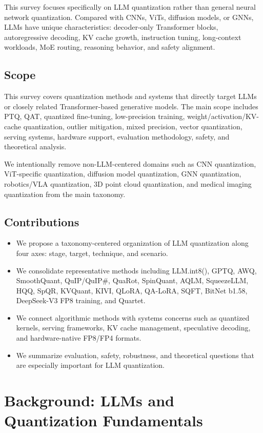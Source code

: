 \documentclass[journal,10pt]{IEEEtran}
\begin{document}
This survey focuses specifically on LLM quantization rather than general neural network quantization. Compared with CNNs, ViTs, diffusion models, or GNNs, LLMs have unique characteristics: decoder-only Transformer blocks, autoregressive decoding, KV cache growth, instruction tuning, long-context workloads, MoE routing, reasoning behavior, and safety alignment.

\subsection{Scope}
This survey covers quantization methods and systems that directly target LLMs or closely related Transformer-based generative models. The main scope includes PTQ, QAT, quantized fine-tuning, low-precision training, weight/activation/KV-cache quantization, outlier mitigation, mixed precision, vector quantization, serving systems, hardware support, evaluation methodology, safety, and theoretical analysis.

We intentionally remove non-LLM-centered domains such as CNN quantization, ViT-specific quantization, diffusion model quantization, GNN quantization, robotics/VLA quantization, 3D point cloud quantization, and medical imaging quantization from the main taxonomy.

\subsection{Contributions}
\begin{itemize}[leftmargin=*,nosep]
  \item We propose a taxonomy-centered organization of LLM quantization along four axes: stage, target, technique, and scenario.
  \item We consolidate representative methods including LLM.int8(), GPTQ, AWQ, SmoothQuant, QuIP/QuIP\#, QuaRot, SpinQuant, AQLM, SqueezeLLM, HQQ, SpQR, KVQuant, KIVI, QLoRA, QA-LoRA, SQFT, BitNet b1.58, DeepSeek-V3 FP8 training, and Quartet.
  \item We connect algorithmic methods with systems concerns such as quantized kernels, serving frameworks, KV cache management, speculative decoding, and hardware-native FP8/FP4 formats.
  \item We summarize evaluation, safety, robustness, and theoretical questions that are especially important for LLM quantization.
\end{itemize}

\section{Background: LLMs and Quantization Fundamentals}
\end{document}
